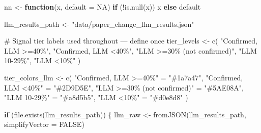 \documentclass[
  11pt,
  letterpaper,
]{article}
\newenvironment{Shaded}{\begin{snugshade}}{\end{snugshade}}
\newcommand{\AttributeTok}[1]{\textcolor[rgb]{0.40,0.45,0.13}{#1}}
\newcommand{\CommentTok}[1]{\textcolor[rgb]{0.37,0.37,0.37}{#1}}
\newcommand{\ConstantTok}[1]{\textcolor[rgb]{0.56,0.35,0.01}{#1}}
\newcommand{\ControlFlowTok}[1]{\textcolor[rgb]{0.00,0.23,0.31}{\textbf{#1}}}
\newcommand{\FunctionTok}[1]{\textcolor[rgb]{0.28,0.35,0.67}{#1}}
\newcommand{\NormalTok}[1]{\textcolor[rgb]{0.00,0.23,0.31}{#1}}
\newcommand{\OtherTok}[1]{\textcolor[rgb]{0.00,0.23,0.31}{#1}}
\newcommand{\SpecialCharTok}[1]{\textcolor[rgb]{0.37,0.37,0.37}{#1}}
\newcommand{\StringTok}[1]{\textcolor[rgb]{0.13,0.47,0.30}{#1}}
\begin{document}
\begin{Shaded}
\begin{Highlighting}[]
\NormalTok{nn }\OtherTok{\textless{}{-}} \ControlFlowTok{function}\NormalTok{(x, }\AttributeTok{default =} \ConstantTok{NA}\NormalTok{) }\ControlFlowTok{if}\NormalTok{ (}\SpecialCharTok{!}\FunctionTok{is.null}\NormalTok{(x)) x }\ControlFlowTok{else}\NormalTok{ default}

\NormalTok{llm\_results\_path }\OtherTok{\textless{}{-}} \StringTok{"data/paper\_change\_llm\_results.json"}

\CommentTok{\# Signal tier labels used throughout — define once}
\NormalTok{tier\_levels }\OtherTok{\textless{}{-}} \FunctionTok{c}\NormalTok{(}
  \StringTok{"Confirmed, LLM \textgreater{}=40\%"}\NormalTok{,}
  \StringTok{"Confirmed, LLM \textless{}40\%"}\NormalTok{,}
  \StringTok{"LLM \textgreater{}=30\% (not confirmed)"}\NormalTok{,}
  \StringTok{"LLM 10{-}29\%"}\NormalTok{,}
  \StringTok{"LLM \textless{}10\%"}
\NormalTok{)}

\NormalTok{tier\_colors\_llm }\OtherTok{\textless{}{-}} \FunctionTok{c}\NormalTok{(}
  \StringTok{"Confirmed, LLM \textgreater{}=40\%"}      \OtherTok{=} \StringTok{"\#1a7a47"}\NormalTok{,}
  \StringTok{"Confirmed, LLM \textless{}40\%"}       \OtherTok{=} \StringTok{"\#2D9D5E"}\NormalTok{,}
  \StringTok{"LLM \textgreater{}=30\% (not confirmed)"} \OtherTok{=} \StringTok{"\#5AE08A"}\NormalTok{,}
  \StringTok{"LLM 10{-}29\%"}                \OtherTok{=} \StringTok{"\#a8d5b5"}\NormalTok{,}
  \StringTok{"LLM \textless{}10\%"}                  \OtherTok{=} \StringTok{"\#d0e8d8"}
\NormalTok{)}

\ControlFlowTok{if}\NormalTok{ (}\FunctionTok{file.exists}\NormalTok{(llm\_results\_path)) \{}
\NormalTok{  llm\_raw }\OtherTok{\textless{}{-}} \FunctionTok{fromJSON}\NormalTok{(llm\_results\_path, }\AttributeTok{simplifyVector =} \ConstantTok{FALSE}\NormalTok{)}


\end{Highlighting}
\end{Shaded}
\end{document}
